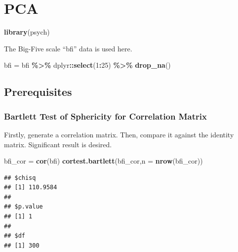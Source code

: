 \documentclass[
]{ctexart}
\newenvironment{Shaded}{\begin{snugshade}}{\end{snugshade}}
\newcommand{\AttributeTok}[1]{\textcolor[rgb]{0.13,0.29,0.53}{#1}}
\newcommand{\DecValTok}[1]{\textcolor[rgb]{0.00,0.00,0.81}{#1}}
\newcommand{\FunctionTok}[1]{\textcolor[rgb]{0.13,0.29,0.53}{\textbf{#1}}}
\newcommand{\NormalTok}[1]{#1}
\newcommand{\OtherTok}[1]{\textcolor[rgb]{0.56,0.35,0.01}{#1}}
\newcommand{\SpecialCharTok}[1]{\textcolor[rgb]{0.81,0.36,0.00}{\textbf{#1}}}
\begin{document}
\hypertarget{pca}{%
\section{PCA}\label{pca}}

\begin{Shaded}
\begin{Highlighting}[]
\FunctionTok{library}\NormalTok{(psych)}
\end{Highlighting}
\end{Shaded}

The Big-Five scale ``bfi'' data is used here.

\begin{Shaded}
\begin{Highlighting}[]
\NormalTok{bfi }\OtherTok{=}\NormalTok{ bfi }\SpecialCharTok{\%\textgreater{}\%}\NormalTok{ dplyr}\SpecialCharTok{::}\FunctionTok{select}\NormalTok{(}\DecValTok{1}\SpecialCharTok{:}\DecValTok{25}\NormalTok{) }\SpecialCharTok{\%\textgreater{}\%} \FunctionTok{drop\_na}\NormalTok{()}
\end{Highlighting}
\end{Shaded}

\hypertarget{prerequisites}{%
\subsection{Prerequisites}\label{prerequisites}}

\hypertarget{bartlett-test-of-sphericity-for-correlation-matrix}{%
\subsubsection{Bartlett Test of Sphericity for Correlation
Matrix}\label{bartlett-test-of-sphericity-for-correlation-matrix}}

Firstly, generate a correlation matrix. Then, compare it against the
identity matrix. Significant result is desired.

\begin{Shaded}
\begin{Highlighting}[]
\NormalTok{bfi\_cor }\OtherTok{=} \FunctionTok{cor}\NormalTok{(bfi)}
\FunctionTok{cortest.bartlett}\NormalTok{(bfi\_cor,}\AttributeTok{n =} \FunctionTok{nrow}\NormalTok{(bfi\_cor))}
\end{Highlighting}
\end{Shaded}

\begin{verbatim}
## $chisq
## [1] 110.9584
## 
## $p.value
## [1] 1
## 
## $df
## [1] 300
\end{verbatim}
\end{document}
